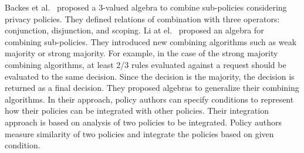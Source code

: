 {%
Backes et al.~\cite{backes04algebra} proposed a 3-valued algebra to combine sub-policies considering privacy policies.
 They defined relations of combination with three operators: conjunction, disjunction, and scoping.
 Li at el.~\cite{Ninghui2009} proposed an algebra for combining sub-policies. 
They introduced new combining algorithms such as weak majority or strong majority.
For example, in the case of the strong majority combining algorithms, at least 2/3 
rules evaluated against a request should be evaluated to the same decision. Since the decision is the majority, 
the decision is returned as a final decision. They proposed algebras to generalize their combining algorithms.
In their approach, policy authors can specify conditions to represent how their policies can be integrated with other policies. 
Their integration approach is based on analysis of two policies to be integrated. Policy authors measure similarity of two policies 
and integrate the policies based on given condition.





}
